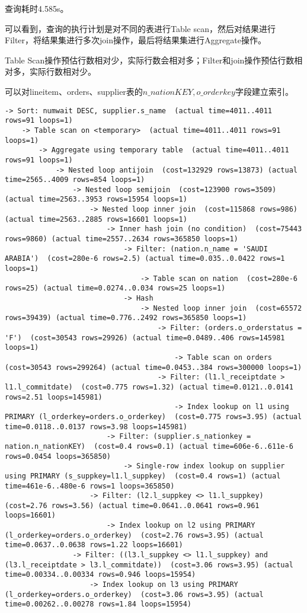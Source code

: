 \documentclass{article}
\begin{document}
查询耗时4.585s。

可以看到，查询的执行计划是对不同的表进行Table scan，然后对结果进行Filter，将结果集进行多次join操作，最后将结果集进行Aggregate操作。

Table Scan操作预估行数相对少，实际行数会相对多；Filter和join操作预估行数相对多，实际行数相对少。

可以对lineitem、orders、supplier表的$n\_nationKEY,o\_orderkey$字段建立索引。

\begin{lstlisting}
-> Sort: numwait DESC, supplier.s_name  (actual time=4011..4011 rows=91 loops=1)
    -> Table scan on <temporary>  (actual time=4011..4011 rows=91 loops=1)
        -> Aggregate using temporary table  (actual time=4011..4011 rows=91 loops=1)
            -> Nested loop antijoin  (cost=132929 rows=13873) (actual time=2565..4009 rows=854 loops=1)
                -> Nested loop semijoin  (cost=123900 rows=3509) (actual time=2563..3953 rows=15954 loops=1)
                    -> Nested loop inner join  (cost=115868 rows=986) (actual time=2563..2885 rows=16601 loops=1)
                        -> Inner hash join (no condition)  (cost=75443 rows=9860) (actual time=2557..2634 rows=365850 loops=1)
                            -> Filter: (nation.n_name = 'SAUDI ARABIA')  (cost=280e-6 rows=2.5) (actual time=0.035..0.0422 rows=1 loops=1)
                                -> Table scan on nation  (cost=280e-6 rows=25) (actual time=0.0274..0.034 rows=25 loops=1)
                            -> Hash
                                -> Nested loop inner join  (cost=65572 rows=39439) (actual time=0.776..2492 rows=365850 loops=1)
                                    -> Filter: (orders.o_orderstatus = 'F')  (cost=30543 rows=29926) (actual time=0.0489..406 rows=145981 loops=1)
                                        -> Table scan on orders  (cost=30543 rows=299264) (actual time=0.0453..384 rows=300000 loops=1)
                                    -> Filter: (l1.l_receiptdate > l1.l_commitdate)  (cost=0.775 rows=1.32) (actual time=0.0121..0.0141 rows=2.51 loops=145981)
                                        -> Index lookup on l1 using PRIMARY (l_orderkey=orders.o_orderkey)  (cost=0.775 rows=3.95) (actual time=0.0118..0.0137 rows=3.98 loops=145981)
                        -> Filter: (supplier.s_nationkey = nation.n_nationKEY)  (cost=0.4 rows=0.1) (actual time=606e-6..611e-6 rows=0.0454 loops=365850)
                            -> Single-row index lookup on supplier using PRIMARY (s_suppkey=l1.l_suppkey)  (cost=0.4 rows=1) (actual time=461e-6..480e-6 rows=1 loops=365850)
                    -> Filter: (l2.l_suppkey <> l1.l_suppkey)  (cost=2.76 rows=3.56) (actual time=0.0641..0.0641 rows=0.961 loops=16601)
                        -> Index lookup on l2 using PRIMARY (l_orderkey=orders.o_orderkey)  (cost=2.76 rows=3.95) (actual time=0.0637..0.0638 rows=1.22 loops=16601)
                -> Filter: ((l3.l_suppkey <> l1.l_suppkey) and (l3.l_receiptdate > l3.l_commitdate))  (cost=3.06 rows=3.95) (actual time=0.00334..0.00334 rows=0.946 loops=15954)
                    -> Index lookup on l3 using PRIMARY (l_orderkey=orders.o_orderkey)  (cost=3.06 rows=3.95) (actual time=0.00262..0.00278 rows=1.84 loops=15954)
\end{lstlisting}
\end{document}
